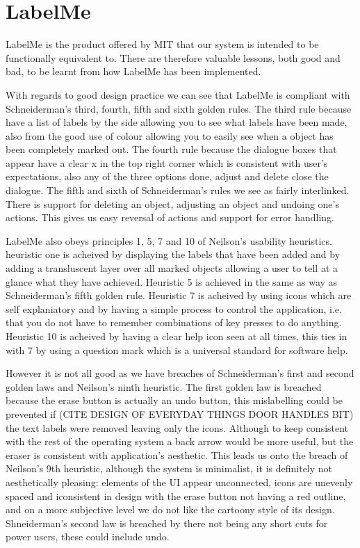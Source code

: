 \documentclass[a4paper,11pt,oneside]{article}
\begin{document}
\section{LabelMe}
LabelMe is the product offered by MIT that our system is intended to be
functionally equivalent to.  There are therefore valuable lessons, both good and
bad, to be learnt from how LabelMe has been implemented.

With regards to good design practice we can see that LabelMe is compliant with
Schneiderman's third, fourth, fifth and sixth golden rules.  The third rule
because have a list of labels by the side allowing you to see what labels have
been made, also from the good use of colour allowing you to easily see when a
object has been completely marked out.  The fourth rule because the dialogue
boxes that appear have a clear x in the top right corner which is consistent
with user's expectations, also any of the three options done, adjust and delete
close the dialogue.  The fifth and sixth of Schneiderman's rules we see as
fairly interlinked.  There is support for deleting an object, adjusting an
object and undoing one's actions.  This gives us easy reversal of actions and
support for error handling.

LabelMe also obeys principles 1, 5, 7 and 10 of Neilson's usability heuristics. 
heuristic one is acheived by displaying the labels that have been added and by
adding a transluscent layer over all marked objects allowing a user to tell at a
glance what they have achieved.  Heuristic 5 is achieved in the same as way as
Schneiderman's fifth golden rule.  Heuristic 7 is acheived by using icons which
are self explaniatory and by having a simple process to control the application,
 i.e. that you do not have to remember combinations of key presses to do
anything. Heuristic 10 is acheived by having a clear help icon seen at all
times, this ties in with 7 by using a question mark which is a universal
standard for software help.

However it is not all good as we have breaches of Schneiderman's first and
second golden laws and Neilson's ninth heuristic.  The first golden law is
breached because the erase button is actually an undo button, this mislabelling
could be prevented if (CITE DESIGN OF EVERYDAY THINGS DOOR HANDLES BIT) the text
labels were removed leaving only the icons.  Although to keep consistent with
the rest of the operating system a back arrow would be more useful, but the
eraser is consistent with application's aesthetic.  This leads us onto the
breach of Neilson's 9th heuristic, although the system is minimalist, it is
definitely not aesthetically pleasing: elements of the UI appear unconnected,
icons are unevenly spaced and iconsistent in design with the erase button not
having a red outline, and on a more subjective level we do not like the cartoony
style of its design.  Shneiderman's second law is breached by there not being
any short cuts for power users, these could include undo.
\end{document}
